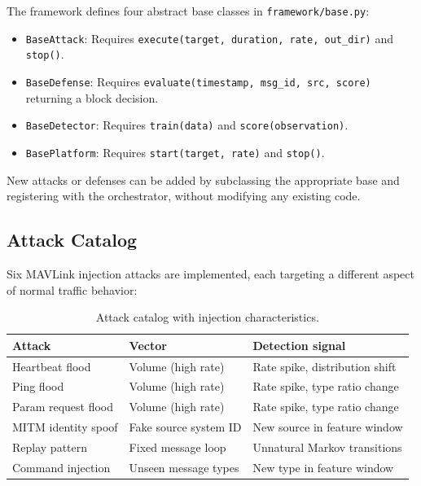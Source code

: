 The framework defines four abstract base classes in
\texttt{framework/base.py}:

\begin{itemize}
    \item \texttt{BaseAttack}: Requires \texttt{execute(target, duration,
          rate, out\_dir)} and \texttt{stop()}.
    \item \texttt{BaseDefense}: Requires \texttt{evaluate(timestamp,
          msg\_id, src, score)} returning a block decision.
    \item \texttt{BaseDetector}: Requires \texttt{train(data)} and
          \texttt{score(observation)}.
    \item \texttt{BasePlatform}: Requires \texttt{start(target, rate)}
          and \texttt{stop()}.
\end{itemize}

New attacks or defenses can be added by subclassing the appropriate base
and registering with the orchestrator, without modifying any existing code.

\subsection{Attack Catalog}

Six MAVLink injection attacks are implemented, each targeting a different
aspect of normal traffic behavior:

\begin{table}[t]
\centering
\caption{Attack catalog with injection characteristics.}
\label{tab:attacks}
\begin{tabular}{lll}
\toprule
\textbf{Attack} & \textbf{Vector} & \textbf{Detection signal} \\
\midrule
Heartbeat flood     & Volume (high rate)       & Rate spike, distribution shift \\
Ping flood          & Volume (high rate)       & Rate spike, type ratio change \\
Param request flood & Volume (high rate)       & Rate spike, type ratio change \\
MITM identity spoof & Fake source system ID    & New source in feature window \\
Replay pattern      & Fixed message loop       & Unnatural Markov transitions \\
Command injection   & Unseen message types     & New type in feature window \\
\bottomrule
\end{tabular}
\end{table}

